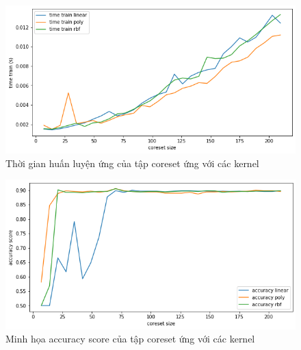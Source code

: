 \documentclass[a4paper, 12pt, oneside]{report}
\begin{document}
\begin{center}
    \begin{figure}[H]
    \begin{center}
     \includegraphics[scale=0.5]{timetrain_AR_gender.png}
    \end{center}
     \caption{Thời gian huấn luyện ứng của tập coreset ứng với các kernel}
    \label{Hình 5.12}
    \end{figure}
\end{center}
\begin{center}
    \begin{figure}[H]
    \begin{center}
     \includegraphics[scale=0.5]{accuracy_AR_gender.png}
    \end{center}
     \caption{Minh họa accuracy score của tập coreset ứng với các kernel}
    \label{Hình 5.13}
    \end{figure}
\end{center}
\end{document}
